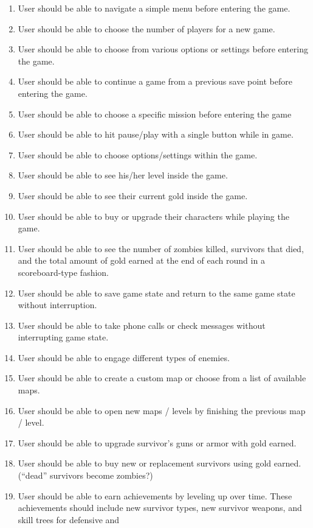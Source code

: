 \documentclass[oneside]{article}%
\begin{document}
\begin{enumerate}[*]

	\item User should be able to navigate a simple menu before entering the game.
	\item User should be able to choose the number of players for a new game.
	\item User should be able to choose from various options or settings before entering the game.
	\item User should be able to continue a game from a previous save point before entering the game.
	\item User should be able to choose a specific mission before entering the game
	\item User should be able to hit pause/play with a single button while in game.
	\item User should be able to choose options/settings within the game.
	\item User should be able to see his/her level inside the game.
	\item User should be able to see their current gold inside the game.
	\item User should be able to buy or upgrade their characters while playing the game.
	\item User should be able to see the number of zombies killed, survivors that died, and the total
amount of gold earned at the end of each round in a scoreboard-type fashion.
	\item User should be able to save game state and return to the same game state without
interruption.
	\item User should be able to take phone calls or check messages without interrupting game state.
	\item User should be able to engage different types of enemies.
	\item User should be able to create a custom map or choose from a list of available maps.
	\item User should be able to open new maps / levels by finishing the previous map / level.
	\item User should be able to upgrade survivor’s guns or armor with gold earned.
	\item User should be able to buy new or replacement survivors using gold earned. (“dead” survivors become zombies?)
	\item User should be able to earn achievements by leveling up over time. These achievements
should include new survivor types, new survivor weapons, and skill trees for defensive and

\end{enumerate}
\end{document}

